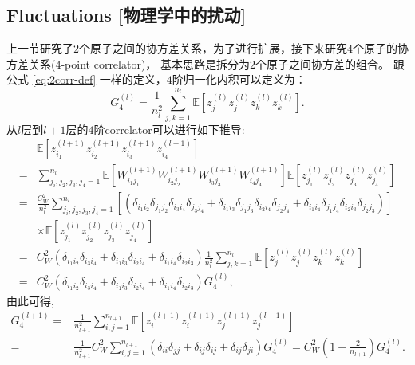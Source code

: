 \subsection{Fluctuations [物理学中的扰动]}
上一节研究了$2$个原子之间的协方差关系，为了进行扩展，接下来研究$4$个原子的协方差关系($4$-point correlator)，
基本思路是拆分为$2$个原子之间协方差的组合。
跟公式 \ref{eq:2corr-def} 一样的定义，$4$阶归一化内积可以定义为：
\begin{equation}
    G_4^{(l)} = \frac{1}{n_l^2} \sum_{j,k=1}^{n_l} 
        \mathbb{E}[z_j^{(l)}z_j^{(l)}z_k^{(l)}z_k^{(l)}].
\end{equation}
从$l$层到$l+1$层的$4$阶correlator可以进行如下推导:
\begin{equation}
    \begin{aligned}
        & \mathbb{E}[z_{i_1}^{(l+1)}z_{i_2}^{(l+1)}z_{i_3}^{(l+1)}z_{i_4}^{(l+1)}] \\
        =& \sum_{j_i,j_2,j_3,j_4=1}^{n_l} 
            \mathbb{E}[W_{i_1j_1}^{(l+1)}W_{i_2j_2}^{(l+1)} W_{i_3j_3}^{(l+1)}W_{i_4j_4}^{(l+1)}] 
            \mathbb{E}[z_{j_1}^{(l)}z_{j_2}^{(l)} z_{j_3}^{(l)}z_{j_4}^{(l)}] \\
        =& \frac{C_W^2}{n_l^2} \sum_{j_i,j_2,j_3,j_4=1}^{n_l} 
            [(\delta_{i_1i_2}\delta_{j_1j_2}\delta_{i_3i_4}\delta_{j_3j_4}
            +\delta_{i_1i_3}\delta_{j_1j_3}\delta_{i_2i_4}\delta_{j_2j_4}
            +\delta_{i_1i_4}\delta_{j_1j_4}\delta_{i_2i_3}\delta_{j_2j_3})] \\
        & \times \mathbb{E}[z_{j_1}^{(l)}z_{j_2}^{(l)}z_{j_3}^{(l)}z_{j_4}^{(l)}] \\
        = & C_W^2 (\delta_{i_1i_2}\delta_{i_3i_4} + \delta_{i_1i_3}\delta_{i_2i_4} 
            + \delta_{i_1i_4}\delta_{i_2i_3}) \frac{1}{n_l^2} 
            \sum_{j,k=1}^{n_l}\mathbb{E}[z_j^{(l)}z_j^{(l)}z_k^{(l)}z_k^{(l)}] \\
        = & C_W^2 (\delta_{i_1i_2}\delta_{i_3i_4} + \delta_{i_1i_3}\delta_{i_2i_4} 
            + \delta_{i_1i_4}\delta_{i_2i_3}) G_4^{(l)},
    \end{aligned}
    \label{eq:4point-recur}
\end{equation}
由此可得,
\begin{equation}
    \begin{aligned}
    G_4^{(l+1)} = & \frac{1}{n_{l+1}^2} \sum_{i,j=1}^{n_{l+1}}
        \mathbb{E}[z_i^{(l+1)}z_i^{(l+1)}z_j^{(l+1)}z_j^{(l+1)}] \\
        = & \frac{1}{n_{l+1}^2} C_W^2 \sum_{i,j=1}^{n_{l+1}}
            (\delta_{ii}\delta_{jj} + \delta_{ij}\delta_{ij} + \delta_{ij}\delta_{ji}) G_4^{(l)} 
        = C_W^2 (1 + \frac{2}{n_{l+1}}) G_4^{(l)}.
    \end{aligned}
\end{equation}
